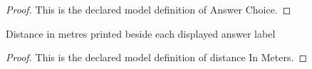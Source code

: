 \begin{proof}
  This is the declared model definition of Answer Choice.
\end{proof}
\begin{definition}
  \label{def:physics:phyx-mini-0817:phyxminiproblems-problemphyxmini0817-answerchoice-distanceinmeters}
  Distance in metres printed beside each displayed answer label
\end{definition}
\begin{proof}
  This is the declared model definition of distance In Meters.
\end{proof}
